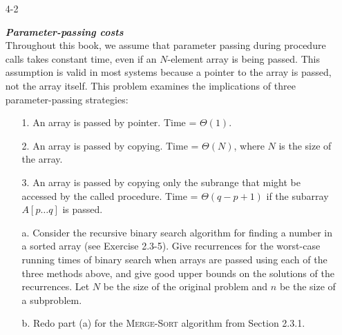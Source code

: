 \begin{enumerate}
\newpage

\item[4{-}2]{\textbf{\emph{Parameter-passing costs}}\\
Throughout this book, we assume that parameter passing during procedure calls
takes constant time, even if an $N$-element array is being passed. This
assumption is valid in most systems because a pointer to the array is passed,
not the array itself.  This problem examines the implications of three
parameter-passing strategies:

\begin{enumerate}
  \item[1.] An array is passed by pointer. Time = $\Theta(1)$.
  \item[2.] An array is passed by copying. Time = $\Theta(N)$, where $N$ is the size
    of the array.
  \item[3.] An array is passed by copying only the subrange that might be accessed
    by the called procedure. Time = $\Theta(q - p + 1)$ if the subarray $A[p
    \dots q]$ is passed.
\end{enumerate}

\begin{enumerate}
  \item[a.] Consider the recursive binary search algorithm for finding a number
    in a sorted array (see Exercise 2.3-5). Give recurrences for the worst-case
    running times of binary search when arrays are passed using each of the
    three methods above, and give good upper bounds on the solutions of the
    recurrences. Let $N$ be the size of the original problem and $n$ be the size
    of a subproblem.
  \item[b.] Redo part (a) for the \textsc{Merge-Sort} algorithm from Section
    2.3.1.
\end{enumerate}
}


\end{enumerate}

